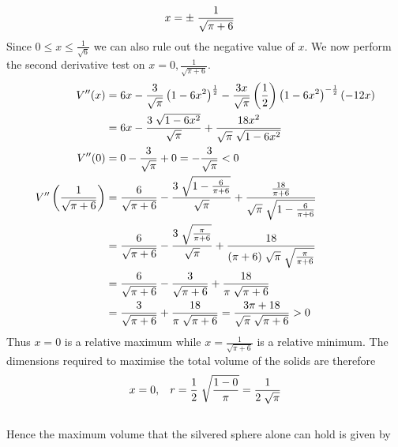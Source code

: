 \documentclass[12pt]{amsart}
\begin{document}
\begin{enumerate}
\begin{align}
				x & = \pm \hspace{0.1cm} \frac{1}{\sqrt{\pi+6}} \notag
			\end{align}
		Since $0\le x \le \frac{1}{\sqrt{6}}$ we can also rule out the negative value of $x$. We now perform 	 		the second derivative test on $x=0, \frac{1}{\sqrt{\pi+6}}$.
			\begin{align}
				V''(x)&=6x-\frac{3}{\sqrt{\pi}}\left(1-6x^2\right)^{\frac{1}{2}}-\frac{3x}{\sqrt{\pi}}
				\left(\frac{1}{2}\right)\left(1-6x^2\right)^{-\frac{1}{2}}\left(-12x\right) \notag \\
				&=6x-\frac{3 \hspace{0.1cm} \sqrt{1-6x^2}}{\sqrt{\pi}}+\frac{18x^2}{\sqrt{\pi} 
				\hspace{0.1cm} \sqrt{1-6x^2}} \notag \\
				V''(0)&=0-\frac{3}{\sqrt{\pi}}+0 = -\frac{3}{\sqrt{\pi}} < 0 \notag \\
				V''\left(\frac{1}{\sqrt{\pi+6}}\right)&=\frac{6}{\sqrt{\pi+6}}-\frac{3\hspace{0.1cm}
				\sqrt{1-\frac{6}{\pi+6}}}{\sqrt{\pi}}+\frac{\frac{18}{\pi+6}}{\sqrt{\pi} \hspace{0.1cm} 
				\sqrt{1-\frac{6}{\pi+6}}} \notag \\
				&=\frac{6}{\sqrt{\pi+6}}-\frac{3\hspace{0.1cm}\sqrt{\frac{\pi}{\pi+6}}}{\sqrt{\pi}}+
				\frac{18}{(\pi+6) \hspace{0.1cm} \sqrt{\pi} \hspace{0.1cm}\sqrt{\frac{\pi}{\pi+6}}} \notag \\
				&=\frac{6}{\sqrt{\pi+6}}-\frac{3}{\sqrt{\pi+6}}+\frac{18}{\pi \hspace{0.1cm} \sqrt{\pi+6}} 					\notag \\
				&=\frac{3}{\sqrt{\pi+6}}+\frac{18}{\pi \hspace{0.1cm} \sqrt{\pi+6}}=
				\frac{3\pi+18}{\sqrt{\pi} \hspace{0.1cm} \sqrt{\pi+6}} > 0 \notag
			\end{align} 
		Thus $x=0$ is a relative maximum while $x=\frac{1}{\sqrt{\pi+6}}$ is a relative minimum. The 
		dimensions required to maximise the total volume of the solids are therefore
		$$x=0, \hspace{0.3cm} r=\frac{1}{2} \hspace{0.1cm} \sqrt{\frac{1-0}{\pi}}=\frac{1}{2\hspace{0.1cm}
		\sqrt{\pi}}$$
		\\
		Hence the maximum volume that the silvered sphere alone can hold is given by

\end{enumerate}
\end{document}
